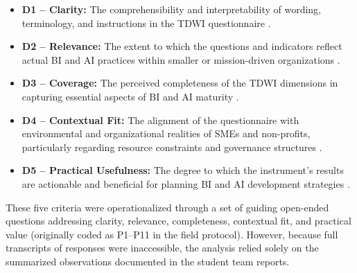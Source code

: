 \documentclass[conference]{IEEEtran}
\begin{document}
\begin{itemize}
    \item \textbf{D1 – Clarity:} The comprehensibility and interpretability of wording, terminology, and instructions in the TDWI questionnaire \cite{becker2009developing}.
    \item \textbf{D2 – Relevance:} The extent to which the questions and indicators reflect actual BI and AI practices within smaller or mission-driven organizations \cite{rosemann2008applicability}.
    \item \textbf{D3 – Coverage:} The perceived completeness of the TDWI dimensions in capturing essential aspects of BI and AI maturity \cite{becker2009developing, hevner2004design}.
    \item \textbf{D4 – Contextual Fit:} The alignment of the questionnaire with environmental and organizational realities of SMEs and non-profits, particularly regarding resource constraints and governance structures \cite{boudreau2005contextualization}.
    \item \textbf{D5 – Practical Usefulness:} The degree to which the instrument’s results are actionable and beneficial for planning BI and AI development strategies \cite{arnott2015managing, venable2016design}.
\end{itemize}

These five criteria were operationalized through a set of guiding open-ended questions addressing clarity, relevance, completeness, contextual fit, and practical value (originally coded as P1–P11 in the field protocol). However, because full transcripts of responses were inaccessible, the analysis relied solely on the summarized observations documented in the student team reports.
\end{document}
